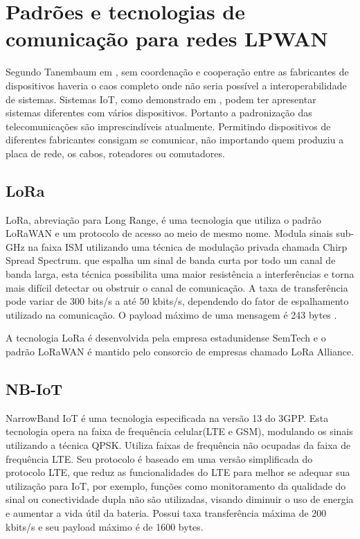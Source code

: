 \section{Padrões e tecnologias de comunicação para redes LPWAN}
\label{padrõesSF}
Segundo Tanembaum em \cite{tanembaum2011}, sem coordenação e cooperação entre as fabricantes de dispositivos haveria o caos completo onde não seria possível a interoperabilidade de sistemas. Sistemas IoT, como demonstrado em \cite{sotres2017practical}, podem ter apresentar sistemas diferentes com vários dispositivos. Portanto a padronização das telecomunicações são imprescindíveis atualmente. Permitindo dispositivos de diferentes fabricantes consigam se comunicar, não importando quem produziu a placa de rede, os cabos, roteadores ou comutadores.

\subsection{LoRa}
LoRa, abreviação para Long Range, é uma tecnologia que utiliza o padrão LoRaWAN e um protocolo de acesso ao meio de mesmo nome. Modula sinais sub-GHz na faixa ISM utilizando uma técnica de modulação  privada chamada Chirp Spread Spectrum. que espalha um sinal de banda curta por todo um canal de banda larga, esta técnica possibilita uma maior resistência a interferências e torna mais difícil detectar ou obstruir o canal de comunicação. A taxa de transferência pode variar de 300 bits/s a até 50 kbits/s, dependendo do fator de espalhamento utilizado na comunicação. O payload máximo de uma mensagem é 243 bytes \cite{mekki2019comparative}.

A tecnologia LoRa é desenvolvida pela empresa estadunidense SemTech e o padrão LoRaWAN é mantido pelo consorcio de empresas chamado LoRa Alliance.

\subsection{NB-IoT}
NarrowBand IoT é uma tecnologia especificada na versão 13 do 3GPP. Esta tecnologia opera na faixa de frequência celular(LTE e GSM), modulando os sinais utilizando a técnica QPSK. Utiliza faixas de frequência não ocupadas da faixa de frequência LTE. Seu protocolo é baseado em uma versão simplificada do protocolo LTE, que reduz as funcionalidades do LTE para melhor se adequar sua utilização para IoT, por exemplo, funções como monitoramento da qualidade do sinal ou conectividade dupla não são utilizadas, visando diminuir o uso de energia e aumentar a vida útil da bateria. Possui taxa transferência máxima de 200 kbits/s e seu payload máximo é de 1600 bytes.

